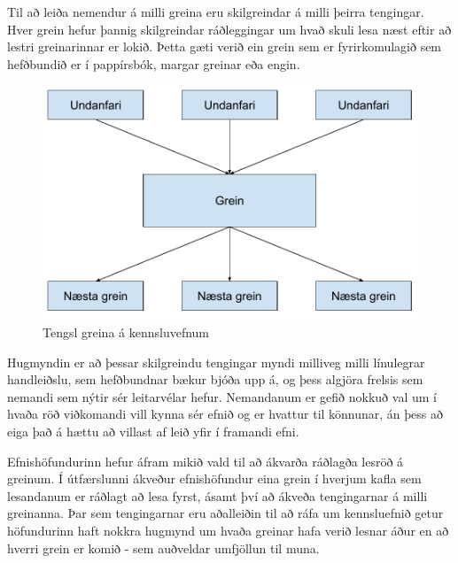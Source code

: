\documentclass[a4paper,12pt,twoside,BCOR=10mm]{scrbook}
\begin{document}
Til að leiða nemendur á milli greina eru skilgreindar á milli þeirra tengingar. Hver grein hefur þannig skilgreindar ráðleggingar um hvað skuli lesa næst eftir að lestri greinarinnar er lokið. Þetta gæti verið ein grein sem er fyrirkomulagið sem hefðbundið er í pappírsbók, margar greinar eða engin.
\begin{figure}
\caption{Tengsl greina á kennsluvefnum}
\label{fig:force-direction}
\begin{center}
\includegraphics[width=0.6\linewidth]{Undanfarar}
\end{center}
\end{figure}
Hugmyndin er að þessar skilgreindu tengingar myndi milliveg milli línulegrar handleiðslu, sem hefðbundnar bækur bjóða upp á, og þess algjöra frelsis sem nemandi sem nýtir sér leitarvélar hefur. Nemandanum er gefið nokkuð val um í hvaða röð viðkomandi vill kynna sér efnið og er hvattur til könnunar, án þess að eiga það á hættu að villast af leið yfir í framandi efni.

Efnishöfundurinn hefur áfram mikið vald til að ákvarða ráðlagða lesröð á greinum. Í útfærslunni ákveður efnishöfundur eina grein í hverjum kafla sem lesandanum er ráðlagt að lesa fyrst, ásamt því að ákveða tengingarnar á milli greinanna. Þar sem tengingarnar eru aðalleiðin til að ráfa um kennsluefnið getur höfundurinn haft nokkra hugmynd um hvaða greinar hafa verið lesnar áður en að hverri grein er komið - sem auðveldar umfjöllun til muna.
\end{document}
